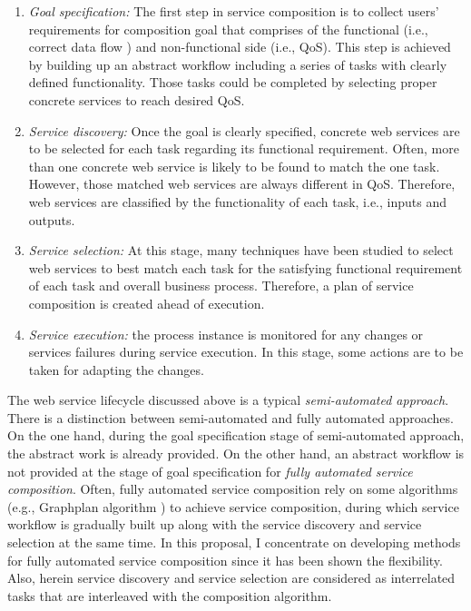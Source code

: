 \begin{enumerate}
 \item \textit{Goal specification:} The first step in service composition is to collect users' requirements for composition goal that comprises of the functional (i.e., correct data flow ) and non-functional side (i.e., QoS). This step is achieved by building up an abstract workflow including a series of tasks with clearly defined functionality. Those tasks could be completed by selecting proper concrete services to reach desired QoS. 
 \item \textit{Service discovery:} Once the goal is clearly specified, concrete web services are to be selected for each task regarding its functional requirement. Often, more than one concrete web service is likely to be found to match the one task. However,  those matched web services are always different in QoS.  Therefore, web services are classified by the functionality of each task, i.e., inputs and outputs.
 \item \textit{Service selection:} At this stage, many techniques have been studied to select web services to best match each task for the satisfying functional requirement of each task and overall business process. Therefore, a plan of service composition is created ahead of execution.

 \item \textit{Service execution:} the process instance is monitored for any changes or services failures during service execution. In this stage, some actions are to be taken for adapting the changes.
\end{enumerate}
The web service lifecycle discussed above is a typical \emph{semi-automated approach}. There is a distinction between semi-automated and fully automated approaches. On the one hand, during the goal specification stage of semi-automated approach, the abstract work is already provided.  On the other hand, an abstract workflow is not provided at the stage of goal specification for \emph{fully automated service composition}. Often, fully automated service composition rely on some algorithms (e.g., Graphplan algorithm \cite{blum1997fast}) to achieve service composition, during which service workflow is gradually built up along with the service discovery and service selection at the same time. In this proposal, I concentrate on developing methods for fully automated service composition since it has been shown the flexibility. Also, herein service discovery and service selection are considered as interrelated tasks that are interleaved with the composition algorithm.


